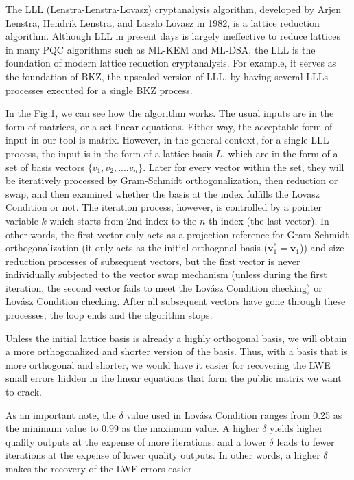\documentclass[runningheads]{llncs}
\begin{document}
The LLL (Lenstra-Lenstra-Lovasz) cryptanalysis algorithm, developed by Arjen Lenstra, Hendrik Lenstra, and Laszlo Lovasz in 1982, is a lattice reduction algorithm. Although LLL in present days is largely ineffective to reduce lattices in many PQC algorithms such as ML-KEM and ML-DSA, the LLL is the foundation of modern lattice reduction cryptanalysis. For example, it serves as the foundation of BKZ, the upscaled version of LLL, by having several LLLs processes executed for a single BKZ process. 

In the Fig.1, we can see how the algorithm works. The usual inputs are in the form of matrices, or a set linear equations. Either way, the acceptable form of input in our tool is matrix. However, in the general context, for a single LLL process, the input is in the form of a lattice basis $L$, which are in the form of a set of basis vectors ${\{v_1, v_2, ....v_n\}}$. Later for every vector within the set, they will be iteratively processed by Gram-Schmidt orthogonalization, then reduction or swap, and then examined whether the basis at the index fulfills the Lovasz Condition or not. The iteration process, however, is controlled by a pointer variable $k$ which starts from 2nd index to the $n$-th index (the last vector). In other words, the first vector only acts as a projection reference for Gram-Schmidt orthogonalization (it only acts as the initial orthogonal basis ($\mathbf{v}_1^* = \mathbf{v}_1$)) and size reduction processes of subsequent vectors, but the first vector is never individually subjected to the vector swap mechanism (unless during the first iteration, the second vector fails to meet the Lovász Condition checking) or Lovász Condition checking. After all subsequent vectors have gone through these processes, the loop ends and the algorithm stops. 

Unless the initial lattice basis is already a highly orthogonal basis, we will obtain a more orthogonalized and shorter version of the basis. Thus, with a basis that is more orthogonal and shorter, we would have it easier for recovering the LWE small errors hidden in the linear equations that form the public matrix we want to crack. 

As an important note, the $\delta$ value used in Lovász Condition ranges from 0.25 as the minimum value to 0.99 as the maximum value. A higher $\delta$ yields higher quality outputs at the expense of more iterations, and a lower $\delta$ leads to fewer iterations at the expense of lower quality outputs. In other words, a higher $\delta$ makes the recovery of the LWE errors easier.
\end{document}
